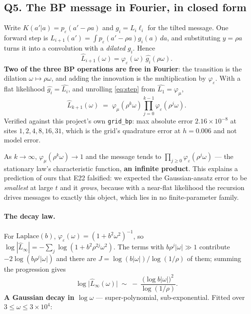 \documentclass[10pt,a4paper]{article}
\newcommand{\corr}{\rho}
\newcommand{\code}[1]{\texttt{\small #1}}
\newcommand{\st}[1]{\textbf{#1}}
\begin{document}
\subsection{Q5. The BP message in Fourier, in closed form}

Write $K(a'|a) = p_\varepsilon(a' - \corr a)$ and $g_i = L_i \ell_i$ for the tilted message. One
forward step is $L_{i+1}(a') = \int p_\varepsilon(a'-\corr a)g_i(a)\,da$, and substituting
$y = \corr a$ turns it into a convolution with a \emph{dilated} $g_i$. Hence
\begin{equation}
\widehat{L}_{i+1}(\omega) = \varphi_\varepsilon(\omega)\,\widehat{g_i}(\corr\omega).
\label{eq:step}
\end{equation}
\st{Two of the three BP operations are free in Fourier}: the transition is the dilation
$\omega\mapsto\corr\omega$, and adding the innovation is the multiplication by
$\varphi_\varepsilon$. With a flat likelihood $\widehat{g_i} = \widehat{L_i}$, and unrolling
\eqref{eq:step} from $\widehat{L_1} = \varphi_\mu$,
\begin{equation}
\boxed{\;\widehat{L}_{k+1}(\omega) \;=\; \varphi_\mu(\corr^k\omega)\prod_{j=0}^{k-1}\varphi_\varepsilon(\corr^j\omega).\;}
\label{eq:closed}
\end{equation}
Verified against this project's own \code{grid\_bp}: max absolute error
$2.16\times10^{-8}$ at sites $1,2,4,8,16,31$, which is the grid's quadrature error at
$h=0.006$ and not model error.

As $k\to\infty$, $\varphi_\mu(\corr^k\omega)\to1$ and the message tends to
$\prod_{j\ge0}\varphi_\varepsilon(\corr^j\omega)$ --- the stationary law's characteristic
function, \st{an infinite product}. This explains a prediction of ours that E22 falsified: we
expected the Gaussian-ansatz error to be \emph{smallest} at large $t$ and it \emph{grows},
because with a near-flat likelihood the recursion drives messages to exactly this object, which
lies in no finite-parameter family.

\paragraph{The decay law.} For $\mathrm{Laplace}(b)$,
$\varphi_\varepsilon(\omega) = (1+b^2\omega^2)^{-1}$, so
$\log|\widehat{L}_\infty| = -\sum_j\log(1+b^2\corr^{2j}\omega^2)$. The terms with
$b\corr^j|\omega|\gg1$ contribute $-2\log(b\corr^j|\omega|)$ and there are
$J = \log(b|\omega|)/\log(1/\corr)$ of them; summing the progression gives
\begin{equation}
\log\bigl|\widehat{L}_\infty(\omega)\bigr| \;\sim\; -\,\frac{\bigl(\log b|\omega|\bigr)^{2}}{\log(1/\corr)} .
\label{eq:decay}
\end{equation}
\st{A Gaussian decay in $\log\omega$} --- super-polynomial, sub-exponential. Fitted over
$3\le\omega\le3\times10^4$:
\end{document}
